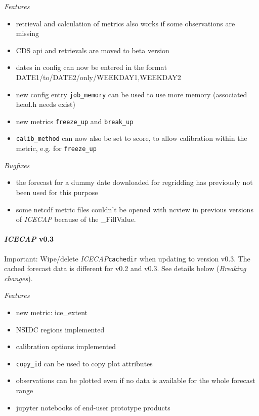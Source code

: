 \documentclass[DIV=10, parskip=full]{scrreprt}
\newcommand{\ice}{\textit{ICECAP}\xspace}
\begin{document}
\textit{Features}
\begin{itemize}
	\item retrieval and calculation of metrics also works if some observations are missing
	\item CDS api and retrievals are moved to beta version
	\item dates in config can now be entered in the format DATE1/to/DATE2/only/WEEKDAY1,WEEKDAY2
	\item new config entry \texttt{job\_memory} can be used to use more memory (associated head.h needs exist)
	\item new metrics \texttt{freeze\_up} and \texttt{break\_up}
	\item \texttt{calib\_method} can now also be set to score, to allow calibration within the metric, e.g. for \texttt{freeze\_up}
\end{itemize}

\textit{Bugfixes}
\begin{itemize}
	\item the forecast for a dummy date downloaded for regridding has previously not been used for this purpose
	\item some netcdf metric files couldn't be opened with ncview in previous versions of \ice because of the \_FillValue. 
\end{itemize}

\paragraph{\textbf{\ice v0.3\\[5pt]}}

Important: Wipe/delete \ice \texttt{cachedir} when updating to version v0.3. The cached forecast data is different for v0.2 and v0.3. See details below (\textit{Breaking changes}).

\textit{Features}
\begin{itemize}
	\item new metric: ice\_extent
	\item NSIDC regions implemented
	\item calibration options implemented
	\item \texttt{copy\_id} can be used to copy plot attributes
	\item observations can be plotted even if no data is available for the whole forecast range
	\item jupyter notebooks of end-user prototype products
\end{itemize}
\end{document}
